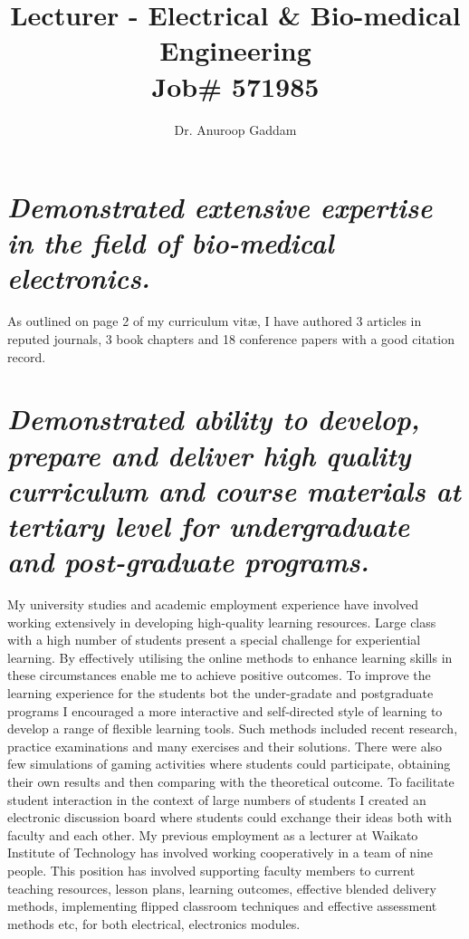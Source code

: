\documentclass{article}
\title{Lecturer - Electrical & Bio-medical Engineering \\Job\# 571985}
\author{Dr. Anuroop Gaddam}
\begin{document}
\onehalfspacing
\maketitle

\section{\textit{\fontsize{12}{12}\selectfont Demonstrated extensive expertise in the field of bio-medical electronics.} }

\fontsize{12}{12}\selectfont As outlined on page 2 of my curriculum vitæ, I have authored 3 articles in reputed journals, 3 book chapters and 18 conference papers with a good citation record. 

\section{\textit{\fontsize{12}{12}\selectfont Demonstrated ability to develop, prepare and deliver high quality curriculum and course materials at tertiary level for undergraduate and post-graduate programs.}}

\fontsize{12}{12}\selectfont My university studies and academic employment experience have involved working extensively in developing high-quality learning resources. Large class with a high number of students present a special challenge for experiential learning. By effectively utilising the online methods to enhance learning skills in these circumstances enable me to achieve positive outcomes. To improve the learning experience for the students bot the under-gradate and postgraduate programs I encouraged a more interactive and self-directed style of learning to develop a range of flexible learning tools. Such methods included recent research, practice examinations and many exercises and their solutions. There were also few simulations of gaming activities where students could participate, obtaining their own results and then comparing with the theoretical outcome. To facilitate student interaction in the context of large numbers of students I created an electronic discussion board where students could exchange their ideas both with faculty and each other. My previous employment as a lecturer at Waikato Institute of Technology has involved working cooperatively in a team of nine people. This position has involved supporting faculty members to current teaching resources, lesson plans, learning outcomes, effective blended delivery methods, implementing flipped classroom techniques and effective assessment methods etc, for both electrical, electronics modules. 
\end{document}
